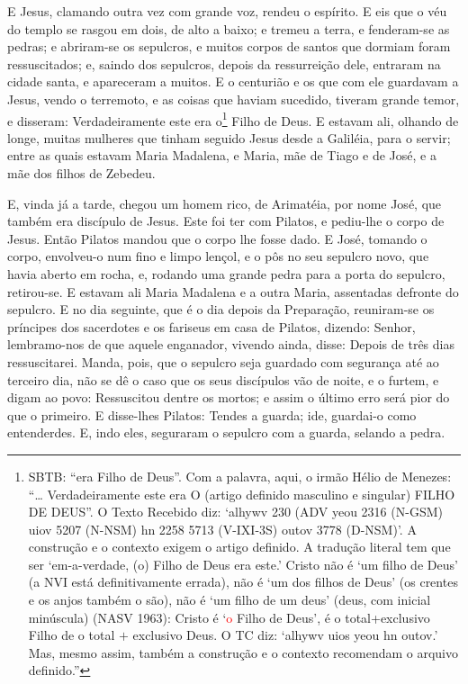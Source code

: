 E Jesus, clamando outra vez com grande voz, rendeu o espírito.
E eis que o véu do templo se rasgou em dois, de alto a baixo;
e tremeu a terra, e fenderam-se as pedras; e abriram-se os
sepulcros, e muitos corpos de santos que dormiam foram
ressuscitados; e, saindo dos sepulcros, depois da
ressurreição dele, entraram na cidade santa, e apareceram a muitos.
E o centurião e os que com ele guardavam a Jesus, vendo o
terremoto, e as coisas que haviam sucedido, tiveram grande temor, e
disseram: Verdadeiramente este era o\footnote{SBTB: ``era Filho de
Deus''. Com a palavra, aqui, o irmão Hélio de Menezes: ``\ldots
Verdadeiramente este era O (artigo definido masculino e singular)
FILHO DE DEUS''. O Texto Recebido diz: `alhywv 230 (ADV yeou 2316
(N-GSM) uiov 5207 (N-NSM) hn 2258 5713 (V-IXI-3S) outov 3778
(D-NSM)'. A construção e o contexto exigem o artigo definido. A
tradução literal tem que ser `em-a-verdade, (o) Filho de Deus era
este.' Cristo não é `um filho de Deus' (a NVI está definitivamente
errada), não é `um dos filhos de Deus' (os crentes e os anjos também
o são), não é `um filho de um deus' (deus, com inicial minúscula)
(NASV 1963): Cristo é `\textcolor{red}{o} Filho de Deus', é o
total+exclusivo Filho de o total $+$ exclusivo Deus. O TC diz:
`alhywv uios yeou hn outov.' Mas, mesmo assim, também a construção e
o contexto recomendam o arquivo definido.''} Filho de Deus. E
estavam ali, olhando de longe, muitas mulheres que tinham seguido
Jesus desde a Galiléia, para o servir; entre as quais estavam
Maria Madalena, e Maria, mãe de Tiago e de José, e a mãe dos filhos
de Zebedeu.

E, vinda já a tarde, chegou um homem rico, de Arimatéia, por nome
José, que também era discípulo de Jesus. Este foi ter com
Pilatos, e pediu-lhe o corpo de Jesus. Então Pilatos mandou que o
corpo lhe fosse dado. E José, tomando o corpo, envolveu-o num
fino e limpo lençol, e o pôs no seu sepulcro novo, que havia
aberto em rocha, e, rodando uma grande pedra para a porta do
sepulcro, retirou-se. E estavam ali Maria Madalena e a outra
Maria, assentadas defronte do sepulcro. E no dia seguinte,
que é o dia depois da Preparação, reuniram-se os príncipes dos
sacerdotes e os fariseus em casa de Pilatos, dizendo: Senhor,
lembramo-nos de que aquele enganador, vivendo ainda, disse: Depois
de três dias ressuscitarei. Manda, pois, que o sepulcro seja
guardado com segurança até ao terceiro dia, não se dê o caso que os
seus discípulos vão de noite, e o furtem, e digam ao povo:
Ressuscitou dentre os mortos; e assim o último erro será pior do que
o primeiro. E disse-lhes Pilatos: Tendes a guarda; ide,
guardai-o como entenderdes. E, indo eles, seguraram o
sepulcro com a guarda, selando a pedra.

